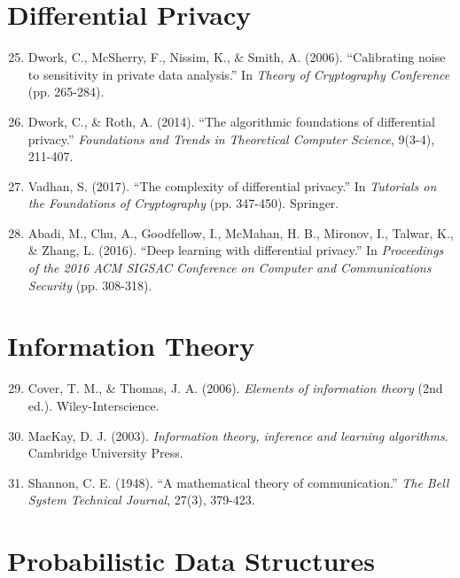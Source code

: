\section*{Differential Privacy}

\begin{enumerate}
\setcounter{enumi}{24}
\item Dwork, C., McSherry, F., Nissim, K., \& Smith, A. (2006). ``Calibrating noise to sensitivity in private data analysis.'' In \textit{Theory of Cryptography Conference} (pp. 265-284).

\item Dwork, C., \& Roth, A. (2014). ``The algorithmic foundations of differential privacy.'' \textit{Foundations and Trends in Theoretical Computer Science}, 9(3-4), 211-407.

\item Vadhan, S. (2017). ``The complexity of differential privacy.'' In \textit{Tutorials on the Foundations of Cryptography} (pp. 347-450). Springer.

\item Abadi, M., Chu, A., Goodfellow, I., McMahan, H. B., Mironov, I., Talwar, K., \& Zhang, L. (2016). ``Deep learning with differential privacy.'' In \textit{Proceedings of the 2016 ACM SIGSAC Conference on Computer and Communications Security} (pp. 308-318).
\end{enumerate}

\section*{Information Theory}

\begin{enumerate}
\setcounter{enumi}{28}
\item Cover, T. M., \& Thomas, J. A. (2006). \textit{Elements of information theory} (2nd ed.). Wiley-Interscience.

\item MacKay, D. J. (2003). \textit{Information theory, inference and learning algorithms}. Cambridge University Press.

\item Shannon, C. E. (1948). ``A mathematical theory of communication.'' \textit{The Bell System Technical Journal}, 27(3), 379-423.
\end{enumerate}

\section*{Probabilistic Data Structures}

